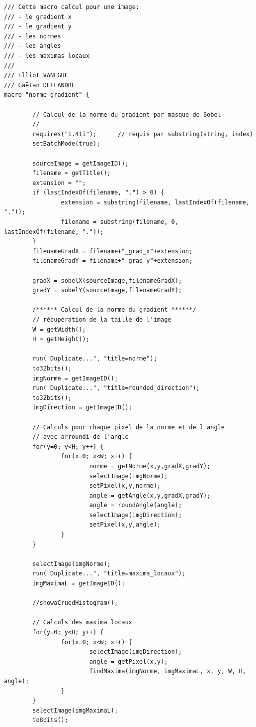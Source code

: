\documentclass[a4paper,11pt]{article}
\begin{document}
  \begin{lstlisting}[caption=Macro de calcul des maxima locaux]
/// Cette macro calcul pour une image:
/// - le gradient x
/// - le gradient y
/// - les normes
/// - les angles
/// - les maximas locaux
///
/// Elliot VANEGUE
/// Gaëtan DEFLANDRE
macro "norme_gradient" {

        // Calcul de la norme du gradient par masque de Sobel
        //
        requires("1.41i");      // requis par substring(string, index)
        setBatchMode(true);

        sourceImage = getImageID();
        filename = getTitle();
        extension = "";
        if (lastIndexOf(filename, ".") > 0) {
                extension = substring(filename, lastIndexOf(filename, "."));
                filename = substring(filename, 0, lastIndexOf(filename, "."));
        }
        filenameGradX = filename+"_grad_x"+extension;
        filenameGradY = filename+"_grad_y"+extension;

        gradX = sobelX(sourceImage,filenameGradX);
        gradY = sobelY(sourceImage,filenameGradY);
        
        /****** Calcul de la norme du gradient ******/
        // récupération de la taille de l'image
        W = getWidth();
        H = getHeight();
        
        run("Duplicate...", "title=norme");
        to32bits();
        imgNorme = getImageID();
        run("Duplicate...", "title=rounded_direction");
        to32bits();
        imgDirection = getImageID();
        
        // Calculs pour chaque pixel de la norme et de l'angle
        // avec arroundi de l'angle
        for(y=0; y<H; y++) {
                for(x=0; x<W; x++) {
                        norme = getNorme(x,y,gradX,gradY);
                        selectImage(imgNorme);
                        setPixel(x,y,norme);
                        angle = getAngle(x,y,gradX,gradY);
                        angle = roundAngle(angle);
                        selectImage(imgDirection);
                        setPixel(x,y,angle);
                }
        }
        
        selectImage(imgNorme);
        run("Duplicate...", "title=maxima_locaux");
        imgMaximaL = getImageID();

        //showaCruedHistogram();

        // Calculs des maxima locaux
        for(y=0; y<H; y++) {
                for(x=0; x<W; x++) {
                        selectImage(imgDirection);
                        angle = getPixel(x,y);
                        findMaxima(imgNorme, imgMaximaL, x, y, W, H, angle);
                }
        }
        selectImage(imgMaximaL);
        to8bits();


\end{lstlisting}
\end{document}
